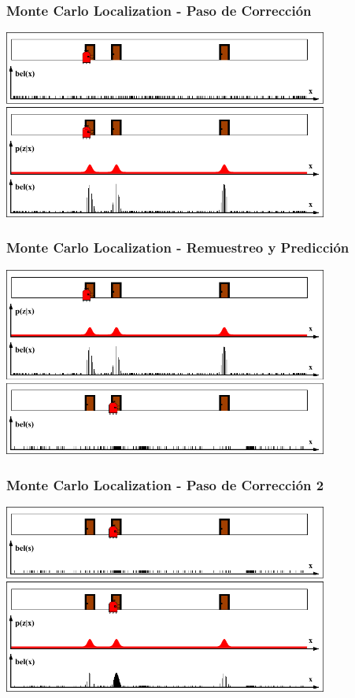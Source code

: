\begin{frame}
    \frametitle{Monte Carlo Localization - Paso de Corrección}

    \begin{center}
        \includegraphics[width=0.8\textwidth]{./images/particle_filter/monte_carlo_correction.pdf}
    \end{center}

\end{frame}

\begin{frame}
    \frametitle{Monte Carlo Localization - Remuestreo y Predicción}

    \begin{center}
        \includegraphics[width=0.8\textwidth]{./images/particle_filter/monte_carlo_resample_and_predict.pdf}
    \end{center}

\end{frame}

\begin{frame}
    \frametitle{Monte Carlo Localization - Paso de Corrección 2}

    \begin{center}
        \includegraphics[width=0.8\textwidth]{./images/particle_filter/monte_carlo_correction2.pdf}
    \end{center}

\end{frame}

